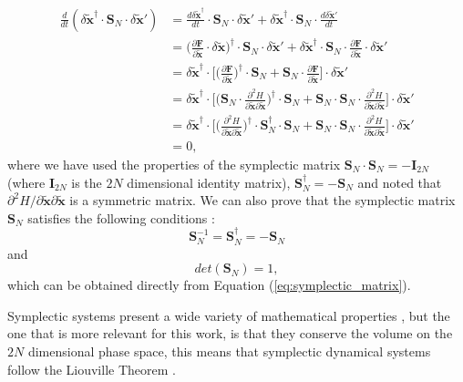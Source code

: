 \begin{align}
\frac{d}{dt}(\delta \tilde{\bm{x}}^{\dagger}\cdot \bm{S}_N\cdot \delta \tilde{\bm{x}}')
&= \frac{d\delta \tilde{\bm{x}}^{\dagger}}{dt}\cdot \bm{S}_N\cdot \delta \tilde{\bm{x}}'+\delta \tilde{\bm{x}}^{\dagger}\cdot \bm{S}_N\cdot \frac{d\delta \tilde{\bm{x}}'}{dt}
\nonumber \\
&= \bigg(\frac{\partial \bm{F}}{\partial \tilde{\bm{x}}}\cdot \delta \tilde{\bm{x}}\bigg)^{\dagger}\cdot \bm{S}_N\cdot \delta \tilde{\bm{x}}'+\delta \tilde{\bm{x}}^{\dagger}\cdot \bm{S}_N \cdot \frac{\partial \bm{F}}{\partial \tilde{\bm{x}}}\cdot \delta \tilde{\bm{x}}'
 \nonumber \\
&= \delta \tilde{\bm{x}}^{\dagger}\cdot \Bigg[\bigg(\frac{\partial \bm{F}}{\partial \tilde{\bm{x}}}\bigg)^{\dagger}\cdot\bm{S}_N+\bm{S}_N\cdot \frac{\partial \bm{F}}{\partial \tilde{\bm{x}}}\Bigg]\cdot \delta\tilde{\bm{x}}'
\nonumber \\
&= \delta\tilde{\bm{x}}^{\dagger}\cdot\Bigg[\bigg(\bm{S}_N\cdot\frac{\partial^2 H}{\partial \tilde{\bm{x}} \partial \tilde{\bm{x}}}\bigg)^{\dagger}\cdot \bm{S}_N+\bm{S}_N\cdot\bm{S}_N\cdot\frac{\partial^2 H}{\partial\tilde{\bm{x}}\partial\tilde{\bm{x}}}\Bigg]\cdot\delta\tilde{\bm{x}}' \nonumber \\
&= \delta\tilde{\bm{x}}^{\dagger}\cdot\Bigg[\bigg(\frac{\partial^2 H}{\partial \tilde{\bm{x}} \partial \tilde{\bm{x}}}\bigg)^{\dagger}\cdot\bm{S}_N^{\dagger}\cdot \bm{S}_N+\bm{S}_N\cdot\bm{S}_N\cdot\frac{\partial^2 H}{\partial\tilde{\bm{x}}\partial\tilde{\bm{x}}}\Bigg]\cdot\delta\tilde{\bm{x}}' \nonumber \\
&=0,
\label{eq:proff_sympl_area}
\end{align} 
where we have used the properties of the symplectic matrix $\bm{S}_N\cdot\bm{S}_N=-\bm{I}_{2N}$ (where $\bm{I}_{2N}$ is the $2N$ dimensional identity matrix), $\bm{S}_N^{\dagger}=-\bm{S}_N$ and noted that $\partial^2H/\partial\tilde{\bm{x}}\partial\tilde{\bm{x}}$ is a symmetric matrix. We can also prove that the symplectic matrix $\bm{S}_N$ satisfies the following conditions \cite{arnold1968probemes} :
\begin{equation}
\bm{S}_N^{-1}=\bm{S}_N^{\dagger}=-\bm{S}_N
\end{equation}
and
\begin{equation}
det(\bm{S}_N)=1,
\end{equation}
which can be obtained directly from Equation (\ref{eq:symplectic_matrix}).\par

Symplectic systems present a wide variety of mathematical properties \cite{arnold1968probemes}, but the one that is more relevant for this work, is that they conserve the volume on the $2N$ dimensional phase space, this means that symplectic dynamical systems follow the Liouville Theorem \cite{ott_chaos_2002}.\par

